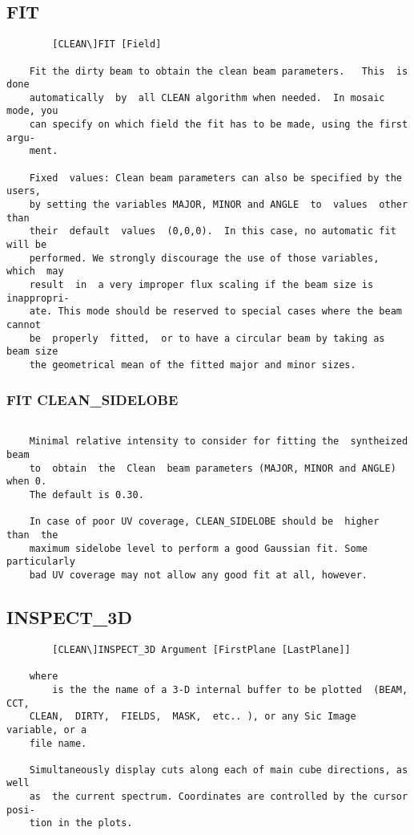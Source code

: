 \subsection{FIT}
\begin{verbatim}
        [CLEAN\]FIT [Field]

    Fit the dirty beam to obtain the clean beam parameters.   This  is  done
    automatically  by  all CLEAN algorithm when needed.  In mosaic mode, you
    can specify on which field the fit has to be made, using the first argu-
    ment.

    Fixed  values: Clean beam parameters can also be specified by the users,
    by setting the variables MAJOR, MINOR and ANGLE  to  values  other  than
    their  default  values  (0,0,0).  In this case, no automatic fit will be
    performed. We strongly discourage the use of those variables, which  may
    result  in  a very improper flux scaling if the beam size is inappropri-
    ate. This mode should be reserved to special cases where the beam cannot
    be  properly  fitted,  or to have a circular beam by taking as beam size
    the geometrical mean of the fitted major and minor sizes.

\end{verbatim}
\subsubsection{FIT CLEAN\_SIDELOBE}
\begin{verbatim}

    Minimal relative intensity to consider for fitting the  syntheized  beam
    to  obtain  the  Clean  beam parameters (MAJOR, MINOR and ANGLE) when 0.
    The default is 0.30.

    In case of poor UV coverage, CLEAN_SIDELOBE should be  higher  than  the
    maximum sidelobe level to perform a good Gaussian fit. Some particularly
    bad UV coverage may not allow any good fit at all, however.

\end{verbatim}
\subsection{INSPECT\_3D}
\begin{verbatim}
        [CLEAN\]INSPECT_3D Argument [FirstPlane [LastPlane]]

    where
        is the the name of a 3-D internal buffer to be plotted  (BEAM,  CCT,
    CLEAN,  DIRTY,  FIELDS,  MASK,  etc.. ), or any Sic Image variable, or a
    file name.

    Simultaneously display cuts along each of main cube directions, as  well
    as  the current spectrum. Coordinates are controlled by the cursor posi-
    tion in the plots.

\end{verbatim}
